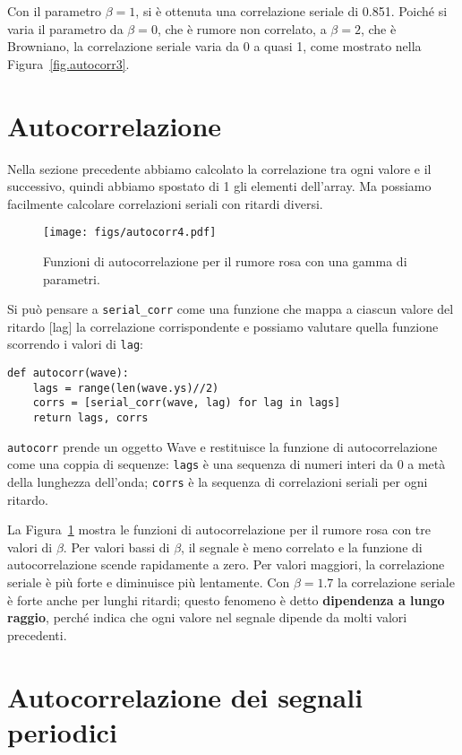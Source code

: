 \documentclass[12pt]{book} \usepackage[width=5.5in,height=8.5in, hmarginratio=3:2,vmarginratio=1:1]{geometry}
\begin{document}
Con il parametro $\beta=1$, si è ottenuta una correlazione seriale di 0.851. Poiché si varia il parametro da $\beta=0$, che è rumore non correlato, a $\beta=2$, che è Browniano, la correlazione seriale varia da 0 a quasi 1, come mostrato nella Figura~\ref{fig.autocorr3}.

\section{Autocorrelazione} \label{autopink} 

Nella sezione precedente abbiamo calcolato la correlazione tra ogni valore e il successivo, quindi abbiamo spostato di 1 gli elementi dell'array. Ma possiamo facilmente calcolare correlazioni seriali con ritardi diversi.

\begin{figure} 

\centerline{\texttt{[image: figs/autocorr4.pdf]}} \caption{Funzioni di autocorrelazione per il rumore rosa con una gamma di parametri.} \label{fig.autocorr4} \end{figure} 

Si può pensare a \verb"serial_corr" come una funzione che mappa a ciascun valore del ritardo [lag] la correlazione corrispondente e possiamo valutare quella funzione scorrendo i valori di {\tt lag}:

\begin{verbatim} 
def autocorr(wave):
    lags = range(len(wave.ys)//2)
    corrs = [serial_corr(wave, lag) for lag in lags]
    return lags, corrs
 \end{verbatim} 

{\tt autocorr} prende un oggetto Wave e restituisce la funzione di autocorrelazione come una coppia di sequenze: {\tt lags} è una sequenza di numeri interi da 0 a metà della lunghezza dell'onda; {\tt corrs} è la sequenza di correlazioni seriali per ogni ritardo.

La Figura~\ref{fig.autocorr4} mostra le funzioni di autocorrelazione per il rumore rosa con tre valori di $\beta$. Per valori bassi di $\beta$, il segnale è meno correlato e la funzione di autocorrelazione scende rapidamente a zero. Per valori maggiori, la correlazione seriale è più forte e diminuisce più lentamente. Con $\beta=1.7$ la correlazione seriale è forte anche per lunghi ritardi; questo fenomeno è detto {\bf dipendenza a lungo raggio}, perché indica che ogni valore nel segnale dipende da molti valori precedenti.

\section{Autocorrelazione dei segnali periodici} 
\end{document}
